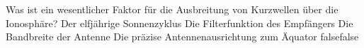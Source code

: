     {Was ist ein wesentlicher Faktor für die Ausbreitung von Kurzwellen über die Ionosphäre?}
    {Der elfjährige Sonnenzyklus}
    {Die Filterfunktion des Empfängers}
    {Die Bandbreite der Antenne}
    {Die präzise Antennenausrichtung zum Äquator}
    {false}{false}
